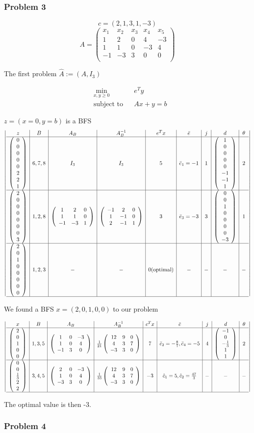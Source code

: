 \documentclass[12pt]{article}
\newcommand{\Q}[1]{\subsubsection*{Problem #1}}
\newcommand{\optimize}[4]{\begin{equation}
\begin{aligned}
& \underset{#1}{\text{#4}}
& & #2 \\
& \text{subject to}
& & #3
\end{aligned}
\end{equation}
}
\newcommand{\minimize}[3]{\optimize{#1}{#2}{#3}{min}}
\newcommand{\Ab}[9]{
\left(
\begin{array}{ccc}
#1&#2&#3 \\
#4&#5&#6 \\
#7&#8&#9 \\
\end{array} 
\right)
}
\newcommand{\Dir}[5]{
\left(
\begin{array}{c}
#1\\#2\\#3\\#4\\#5
\end{array} 
\right)
}
\newcommand{\BDir}[8]{
\left(
\begin{array}{c}
#1\\#2\\#3\\#4\\#5\\#6\\#7\\#8
\end{array} 
\right)
}
\begin{document}
\Q{3}
$$c = (2, 1, 3, 1, -3)$$
\[ A = \left(
\begin{array}{r|r|r|r|r}
x_1&x_2&x_3&x_4&x_5\\
\hline
1&2&0&4&-3 \\
1&1&0&-3&4 \\
-1&-3&3&0&0 \\
\end{array} 
\right) \]


The first problem
$\hat A := (A, I_3)$

\minimize{x, y \geq 0}{e^Ty}{Ax + y = b}
$z = (x = 0, y = b)$ is a BFS
\[\left| 
\begin{array}{c|c|c|c|c|c|c|c|c}
  z & B & A_B & A_B^{-1} & e^Tx & \bar e & j & d & \theta\\
  \hline
   \BDir 0 0 0 0 0 2 2 1 & 6,7,8 & I_3 &
   I_3 &
   5 & \bar e_1 = -1 & 1 & \BDir 1 0 0 0 0 {-1} {-1} 1  & 2 \\
   \hline
   \BDir 2 0 0 0 0 0 0 3 & 1,2,8 & \Ab 1 2 0 1 1 0 {-1} {-3} 1 &
   \Ab {-1}  2 0  1 {-1} 0 2 {-1} 1 &
   3 & \bar e_3 = -3 & 3 & \BDir 0 0 1 0 0 0 0  {-3}  & 1 \\
   \hline
   \BDir 2 0 1 0 0 0 0 0 & 1,2,3 & - &- &
   0 \text{(optimal)} &  - & - & - & - \\
   \hline
\end{array} 
\right| \]

We found a BFS $x = (2, 0, 1, 0, 0)$ to our problem

\[\left| 
\begin{array}{c|c|c|c|c|c|c|c|c}
  x & B & A_B & A_B^{-1} & c^Tx & \bar c & j & d & \theta\\
  \hline
   \Dir 2 0 1 0 0 & 1, 3, 5 & \Ab 1 0 {-3} 1 0 4 {-1} 3 0 &
   \frac{1}{21} \Ab {12} 9 0 4 3 7 {-3} 3 0 &
   7 & \bar c_2 =  -\frac{8}{7}, \bar c_4 = -5 & 4 & \Dir {-1} 0 {-\frac{1}{3}} 1 1  & 2 \\
   \hline
   \Dir 0 0 {\frac{1}{3}} 2 2
   & 3,4,5 & \Ab 2 0 {-3} 1 0 4 {-3} 3 0  &
   \frac{1}{33} \Ab {12} 9 0 4 3 7 {-3} 3 0 &
   -3 & \hat c_1 = 5, \hat c_2 = \frac{47}{3} & - & - & -\\
   \hline
\end{array} 
\right| \]

The optimal value is then -3.


\newpage


\Q{4}
\end{document}

